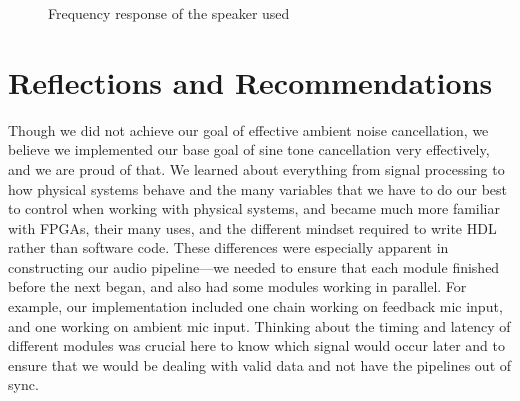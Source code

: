 \documentclass{fpgairpods}
\begin{document}
\begin{figure}
    \centering
    \caption{Frequency response of the speaker used}
    \label{chart:speaker_response}
\end{figure}

\section{Reflections and Recommendations}


Though we did not achieve our goal of effective ambient noise cancellation, we believe we implemented our base goal of sine tone cancellation very effectively, and we are proud of that. We learned about everything from signal processing to how physical systems behave and the many variables that we have to do our best to control when working with physical systems, and became much more familiar with FPGAs, their many uses, and the different mindset required to write HDL rather than software code. These differences were especially apparent in constructing our audio pipeline---we needed to ensure that each module finished before the next began, and also had some modules working in parallel. For example, our implementation included one chain working on feedback mic input, and one working on ambient mic input. Thinking about the timing and latency of different modules was crucial here to know which  signal would occur later and to ensure that we would be dealing with valid data and not have the pipelines out of sync. 
\end{document}
